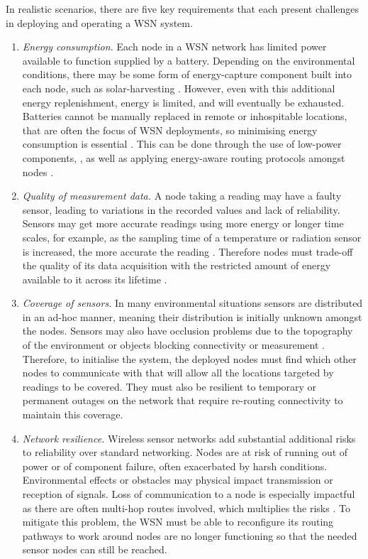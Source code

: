 In realistic scenarios, there are five key requirements that each present challenges in deploying and operating a WSN system.
\begin{enumerate}
\item \label{requirement:energy}\textit{Energy consumption.} Each node in a WSN network has limited power available to function supplied by a battery. Depending on the environmental conditions, there may be some form of energy-capture component built into each node, such as solar-harvesting \citep{Prauzek2018}. However, even with this additional energy replenishment, energy is limited, and will eventually be exhausted. Batteries cannot be manually replaced in remote or inhospitable locations, that are often the focus of WSN deployments, so minimising energy consumption is essential \citep{Anastasi2009}. This can be done through the use of low-power components, \citep{4772585, 8108667}, as well as applying energy-aware routing protocols amongst nodes \citep{s90100445}. 

\item \label{requirement:quality} \textit{Quality of measurement data.} A node taking a reading may have a faulty sensor, leading to variations in the recorded values and lack of reliability. Sensors may get more accurate readings using more energy or longer time scales, for example, as the sampling time of a temperature or radiation sensor is increased, the more accurate the reading \citep{s17061221}. Therefore nodes must trade-off the quality of its data acquisition with the restricted amount of energy available to it across its lifetime \citep{7845391}.

\item \label{requirement:coverage} \textit{Coverage of sensors.} In many environmental situations sensors are distributed in an ad-hoc manner, meaning their distribution is initially unknown amongst the nodes. Sensors may also have occlusion problems due to the topography of the environment or objects blocking connectivity or measurement \citep{10.1007/978-3-540-69170-9_23}. Therefore, to initialise the system, the deployed nodes must find which other nodes to communicate with that will allow all the locations targeted by readings to be covered. They must also be resilient to temporary or permanent outages on the network that require re-routing connectivity to maintain this coverage.

\item \label{requirement:resilience} \textit{Network resilience.} Wireless sensor networks add substantial additional risks to reliability over standard networking. Nodes are at risk of running out of power or of component failure, often exacerbated by harsh conditions. Environmental effects or obstacles may physical impact transmission or reception of signals. Loss of communication to a node is especially impactful as there are often multi-hop routes involved, which multiplies the risks \citep{Paradis2007}. To mitigate this problem, the WSN must be able to reconfigure its routing pathways to work around nodes are no longer functioning so that the needed sensor nodes can still be reached.


\end{enumerate}

